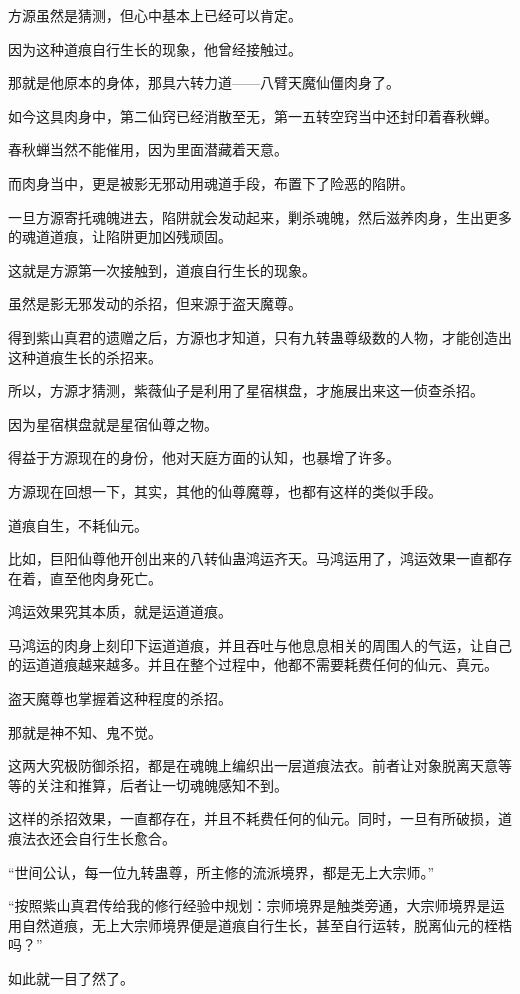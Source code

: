 \begin{this_body}
方源虽然是猜测，但心中基本上已经可以肯定。

因为这种道痕自行生长的现象，他曾经接触过。

那就是他原本的身体，那具六转力道——八臂天魔仙僵肉身了。

如今这具肉身中，第二仙窍已经消散至无，第一五转空窍当中还封印着春秋蝉。

春秋蝉当然不能催用，因为里面潜藏着天意。

而肉身当中，更是被影无邪动用魂道手段，布置下了险恶的陷阱。

一旦方源寄托魂魄进去，陷阱就会发动起来，剿杀魂魄，然后滋养肉身，生出更多的魂道道痕，让陷阱更加凶残顽固。

这就是方源第一次接触到，道痕自行生长的现象。

虽然是影无邪发动的杀招，但来源于盗天魔尊。

得到紫山真君的遗赠之后，方源也才知道，只有九转蛊尊级数的人物，才能创造出这种道痕生长的杀招来。

所以，方源才猜测，紫薇仙子是利用了星宿棋盘，才施展出来这一侦查杀招。

因为星宿棋盘就是星宿仙尊之物。

得益于方源现在的身份，他对天庭方面的认知，也暴增了许多。

方源现在回想一下，其实，其他的仙尊魔尊，也都有这样的类似手段。

道痕自生，不耗仙元。

比如，巨阳仙尊他开创出来的八转仙蛊鸿运齐天。马鸿运用了，鸿运效果一直都存在着，直至他肉身死亡。

鸿运效果究其本质，就是运道道痕。

马鸿运的肉身上刻印下运道道痕，并且吞吐与他息息相关的周围人的气运，让自己的运道道痕越来越多。并且在整个过程中，他都不需要耗费任何的仙元、真元。

盗天魔尊也掌握着这种程度的杀招。

那就是神不知、鬼不觉。

这两大究极防御杀招，都是在魂魄上编织出一层道痕法衣。前者让对象脱离天意等等的关注和推算，后者让一切魂魄感知不到。

这样的杀招效果，一直都存在，并且不耗费任何的仙元。同时，一旦有所破损，道痕法衣还会自行生长愈合。

“世间公认，每一位九转蛊尊，所主修的流派境界，都是无上大宗师。”

“按照紫山真君传给我的修行经验中规划：宗师境界是触类旁通，大宗师境界是运用自然道痕，无上大宗师境界便是道痕自行生长，甚至自行运转，脱离仙元的桎梏吗？”

如此就一目了然了。


\end{this_body}
